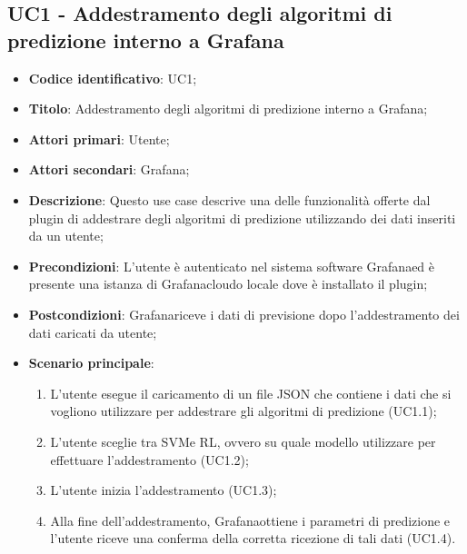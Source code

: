\subsection{UC1 - Addestramento degli algoritmi di predizione interno a Grafana}
\begin{itemize}
	\item \textbf{Codice identificativo}: UC1;
	\item \textbf{Titolo}: Addestramento degli algoritmi di predizione interno a Grafana\glo;
	\item \textbf{Attori primari}: Utente;
	\item \textbf{Attori secondari}: Grafana\glo;
	\item \textbf{Descrizione}: Questo use case descrive una delle funzionalità offerte dal plugin di addestrare degli algoritmi di predizione utilizzando dei dati inseriti da un utente;
	\item \textbf{Precondizioni}: L'utente è autenticato nel sistema software Grafana\glosp ed è presente una istanza di Grafana\glosp cloud\glosp o locale dove è installato il plugin;
	\item \textbf{Postcondizioni}: Grafana\glosp riceve i dati di previsione dopo l'addestramento dei dati caricati da utente;
	\item \textbf{Scenario principale}: 
		\begin{enumerate}
			\item L'utente esegue il caricamento di un file JSON che contiene i dati che si vogliono utilizzare per addestrare gli algoritmi di predizione (UC1.1);
			\item L'utente sceglie tra SVM\glosp e RL\glo, ovvero su quale modello utilizzare per effettuare l'addestramento (UC1.2);
			\item L'utente inizia l'addestramento (UC1.3);
			\item Alla fine dell'addestramento, Grafana\glosp ottiene i parametri di predizione e l'utente riceve una conferma della corretta ricezione di tali dati (UC1.4).
		\end{enumerate}
\end{itemize}

